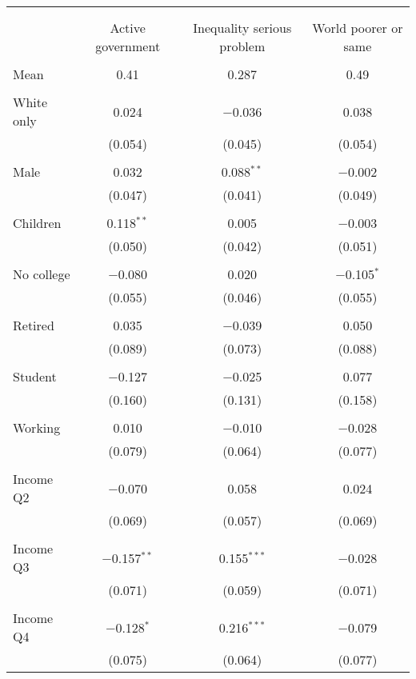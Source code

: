 
\begin{tabular}{@{\extracolsep{5pt}}lccc} 
\\[-1.8ex]\hline 
\hline \\[-1.8ex] 
\\[-1.8ex] & Active government & Inequality serious problem & World poorer or same \\ 
\hline \\[-1.8ex] 
 Mean & 0.41 & 0.287 & 0.49  \\ \hline \\[-1.8ex] White only & 0.024 & $-$0.036 & 0.038 \\ 
  & (0.054) & (0.045) & (0.054) \\ 
  & & & \\ 
 Male & 0.032 & 0.088$^{**}$ & $-$0.002 \\ 
  & (0.047) & (0.041) & (0.049) \\ 
  & & & \\ 
 Children & 0.118$^{**}$ & 0.005 & $-$0.003 \\ 
  & (0.050) & (0.042) & (0.051) \\ 
  & & & \\ 
 No college & $-$0.080 & 0.020 & $-$0.105$^{*}$ \\ 
  & (0.055) & (0.046) & (0.055) \\ 
  & & & \\ 
 Retired & 0.035 & $-$0.039 & 0.050 \\ 
  & (0.089) & (0.073) & (0.088) \\ 
  & & & \\ 
 Student & $-$0.127 & $-$0.025 & 0.077 \\ 
  & (0.160) & (0.131) & (0.158) \\ 
  & & & \\ 
 Working & 0.010 & $-$0.010 & $-$0.028 \\ 
  & (0.079) & (0.064) & (0.077) \\ 
  & & & \\ 
 Income Q2 & $-$0.070 & 0.058 & 0.024 \\ 
  & (0.069) & (0.057) & (0.069) \\ 
  & & & \\ 
 Income Q3 & $-$0.157$^{**}$ & 0.155$^{***}$ & $-$0.028 \\ 
  & (0.071) & (0.059) & (0.071) \\ 
  & & & \\ 
 Income Q4 & $-$0.128$^{*}$ & 0.216$^{***}$ & $-$0.079 \\ 
  & (0.075) & (0.064) & (0.077) \\ 

\end{tabular}
